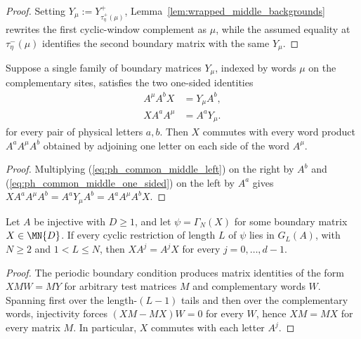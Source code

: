 \begin{proof}
    \leanok
    Setting $Y_\mu:=Y^+_{\tau^+_\eta(\mu)}$,
    Lemma~\ref{lem:wrapped_middle_backgrounds} rewrites the first
    cyclic-window complement as $\mu$, while the assumed equality at
    $\tau^-_\eta(\mu)$ identifies the second boundary matrix with the same
    $Y_\mu$.
\end{proof}

\begin{lemma}%
    \label{lem:common_middle_same_witness_commutation}
    \leanok
    Suppose a single family of boundary matrices $Y_\mu$, indexed by words
    $\mu$ on the complementary sites, satisfies the two one-sided identities
    \begin{align}
        A^\mu A^bX & =Y_\mu A^b,
        \label{eq:ph_common_middle_one_sided} \\
        X A^aA^\mu & =A^aY_\mu.
        \label{eq:ph_common_middle_left}
    \end{align}
    for every pair of physical letters $a,b$. Then $X$ commutes with every word
    product $A^aA^\mu A^b$ obtained by adjoining one letter on each side of the
    word $A^\mu$.
\end{lemma}

\begin{proof}
    \leanok
    Multiplying (\ref{eq:ph_common_middle_left}) on the right by $A^b$ and
    (\ref{eq:ph_common_middle_one_sided}) on the left by $A^a$ gives
    $X A^aA^\mu A^b =A^aY_\mu A^b =A^aA^\mu A^bX$.
\end{proof}

\begin{lemma}%
    \label{thm:boundary_matrix_commutes}
    \leanok
    Let $A$ be injective with $D\ge1$, and let $\psi=\Gamma_N(X)$ for some
    boundary matrix $X\in\MN{D}$. If every cyclic restriction of length $L$ of
    $\psi$ lies in $G_L(A)$, with $N\ge2$ and $1<L\le N$, then
    $X A^j=A^jX$ for every $j=0,\ldots,d-1$.
\end{lemma}

\begin{proof}
    \leanok
    The periodic boundary condition produces matrix identities of the form
    $XMW=MY$ for arbitrary test matrices $M$ and complementary words $W$.
    Spanning first over the length-$(L-1)$ tails and then over the complementary
    words, injectivity forces $(XM-MX)W=0$ for every $W$, hence $XM=MX$ for
    every matrix $M$. In particular, $X$ commutes with each letter $A^j$.
\end{proof}

